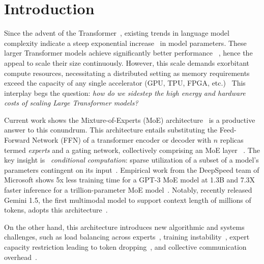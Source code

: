 
\section{Introduction}\label{sec:introduction}
Since the advent of the Transformer~\cite{NEURIPS2017_3f5ee243}, existing trends in language model complexity
indicate a steep exponential increase~\cite{DBLP:journals/corr/abs-2201-11990} in model parameters.
These larger Transformer models achieve significantly better performance
~\cite{DBLP:journals/corr/abs-2005-14165, DBLP:journals/corr/abs-2001-08361},
hence the appeal to scale their size continuously.
However, this scale demands exorbitant compute resources,
necessitating a distributed setting as memory requirements exceed the capacity of any
single accelerator (GPU, TPU, FPGA, etc.)~\cite{DBLP:journals/corr/abs-2201-11990}
This interplay begs the question:
\emph{how do we sidestep the high energy and hardware costs of scaling Large Transformer models?}

Current work shows the Mixture-of-Experts (MoE) architecture~\cite{10.1162/neco.1991.3.1.79}
is a productive answer to this conundrum.
This architecture entails substituting the Feed-Forward Network (FFN) of a transformer
encoder or decoder with $n$ replicas termed \emph{experts} and a gating network, collectively comprising an MoE layer
~\cite{ShazeerMMDLHD17}.
The key insight is ~\emph{conditional computation}: sparse utilization
of a subset of a model’s parameters contingent on its input~\cite{doi:10.1142/S0218001403002411}.
Empirical work from the DeepSpeed team of Microsoft shows 5x less training time for a GPT-3 MoE model at 1.3B and
7.3X faster inference for a trillion-parameter MoE model~\cite{pmlr-v162-rajbhandari22a}.
Notably, recently released Gemini 1.5, the first multimodal model to support context length of millions of tokens,
adopts this architecture~\cite{Gemini_Team_2024}.

On the other hand, this architecture introduces new algorithmic and systems challenges,
such as load balancing across experts~\cite{ShazeerMMDLHD17}, training instability~\cite{NEURIPS2022_3e67e84a},
expert capacity restriction leading to token dropping~\cite{gale2022megablocks},
and collective communication overhead~\cite{DBLP:journals/corr/abs-2006-16668}.